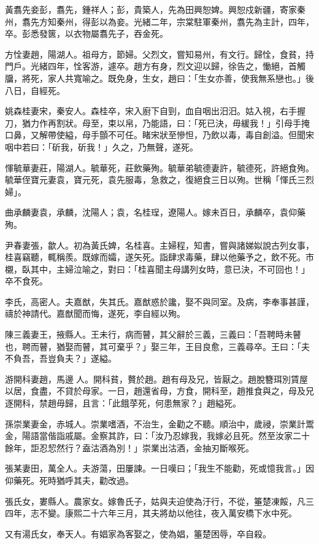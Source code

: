 \begin{pinyinscope}
黃翥先妾彭，翥先，鍾祥人；彭，貴築人，先為田興恕婢。興恕戍新疆，寄家秦州，翥先方知秦州，得彭以為妾。光緒二年，宗棠駐軍秦州，翥先為主計，四年，卒。彭悉發篋，以衣物屬翥先子，吞金死。

方恮妻趙，陽湖人。祖母方，節婦。父烈文，嘗知易州，有文行。歸恮，食貧，持門戶。光緒四年，恮客游，遽卒。趙方有身，烈文迎以歸，徐告之，慟絕，首觸牖，將死，家人共寬喻之。既免身，生女，趙曰：「生女亦善，使我無系戀也。」後八日，自經死。

姚森桂妻宋，秦安人。森桂卒，宋入廚下自剄，血自咽出汨汨。姑入視，右手握刀，猶力作再割狀。母至，束以帛，乃能語，曰：「死已決，毋緩我！」引母手掩口鼻，又解帶使縊，母手顫不可任。睹宋狀至慘怛，乃飲以毒，毒自創溢。但聞宋咽中若曰：「斫我，斫我！」久之，乃無聲，遂死。

惲毓華妻莊，陽湖人。毓華死，莊飲藥殉。毓華弟毓德妻許，毓德死，許絕食殉。毓華侄寶元妻袁，寶元死，袁先服毒，急救之，復絕食三日以殉。世稱「惲氏三烈婦」。

曲承麟妻袁，承麟，沈陽人；袁，名桂珵，遼陽人。嫁未百日，承麟卒，袁仰藥殉。

尹春妻張，歙人。初為黃氏婢，名桂喜。主婦程，知書，嘗與諸娣姒說古列女事，桂喜竊聽，輒稱羨。既嫁而孀，遂矢死。詣肆求毒藥，肆以他藥予之，飲不死。市櫬，臥其中，主婦泣喻之，對曰：「桂喜聞主母講列女時，意已決，不可回也！」卒不食死。

李氏，高密人。夫嘉猷，失其氏。嘉猷惑於讒，娶不與同室。及病，李奉事甚謹，禱於神請代。嘉猷聞而悔，遂死，李自經以殉。

陳三義妻王，掖縣人。王未行，病而瞽，其父辭於三義，三義曰：「吾聘時未瞽也，聘而瞽，猶娶而瞽，其可棄乎？」娶三年，王目良愈，三義尋卒。王曰：「夫不負吾，吾豈負夫？」遂縊。

游開科妻趙，馬邊人。開科貧，贅於趙。趙有母及兄，皆厭之。趙脫簪珥別賃屋以居，食盡，不貸於母家。一日，趙還省母，方食，開科至，趙推食與之，母及兄逐開科，禁趙毋歸，且言：「此餓莩死，何患無家？」趙縊死。

孫崇業妻金，赤城人。崇業嗜酒，不治生，金勸之不聽。順治中，歲祲，崇業計鬻金，陽語當偕詣戚屬。金察其詐，曰：「汝乃忍嫁我，我嫁必且死。然至汝家二十餘年，詎忍恝然行？盍沽酒為別！」崇業出沽酒，金抽刃斷喉死。

張某妻田，萬全人。夫游蕩，田屢諫。一日嘆曰；「我生不能勸，死或憶我言。」因仰藥死。死時猶呼其夫，勸改過。

張氏女，婁縣人。農家女。嫁魯氏子，姑與夫迫使為汙行，不從，箠楚凍餒，凡三四年，志不變。康熙二十六年三月，其夫將劫以他往，夜入萬安橋下水中死。

又有湯氏女，奉天人。有娼家為客娶之，使為娼，箠楚困辱，卒自殺。


\end{pinyinscope}
